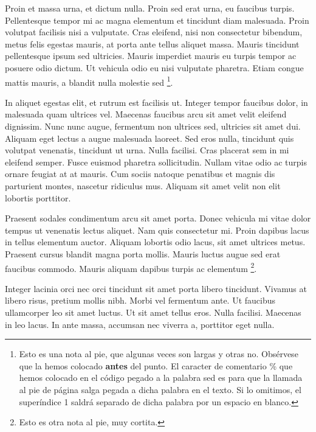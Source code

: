 \documentclass[11pt, a4paper]{report}
\begin{document}
Proin et massa urna, et dictum nulla.
Proin sed erat urna, eu faucibus turpis. Pellentesque tempor mi ac magna elementum et tincidunt diam malesuada. Proin volutpat facilisis nisi a vulputate. Cras eleifend, nisi non consectetur bibendum, metus felis egestas mauris, at porta ante tellus aliquet massa. Mauris tincidunt pellentesque ipsum sed ultricies. Mauris imperdiet mauris eu turpis tempor ac posuere odio dictum. Ut vehicula odio eu nisi vulputate pharetra. Etiam congue mattis mauris, a blandit nulla molestie sed%
\footnote{Esto es una nota al pie, que algunas veces son largas y otras no. Obsérvese que la hemos colocado \textbf{antes} del punto. El caracter de comentario \% que hemos colocado en el código pegado a la palabra sed es para que la llamada al pie de página salga pegada a dicha palabra en el texto. Si lo omitimos, el superíndice 1 saldrá separado de dicha palabra por un espacio en blanco.}.


In aliquet egestas elit, et rutrum est facilisis ut. Integer tempor faucibus dolor, in malesuada quam ultrices vel. Maecenas faucibus arcu sit amet velit eleifend dignissim. Nunc nunc augue, fermentum non ultrices sed, ultricies sit amet dui. Aliquam eget lectus a augue malesuada laoreet. Sed eros nulla, tincidunt quis volutpat venenatis, tincidunt ut urna. Nulla facilisi. Cras placerat sem in mi eleifend semper. Fusce euismod pharetra sollicitudin. Nullam vitae odio ac turpis ornare feugiat at at mauris. Cum sociis natoque penatibus et magnis dis parturient montes, nascetur ridiculus mus. Aliquam sit amet velit non elit lobortis porttitor.

Praesent sodales condimentum arcu sit amet porta.
 Donec vehicula mi vitae dolor tempus ut venenatis lectus aliquet. Nam quis consectetur mi. Proin dapibus lacus in tellus elementum auctor. Aliquam lobortis odio lacus, sit amet ultrices metus. Praesent cursus blandit magna porta mollis. Mauris luctus augue sed erat faucibus commodo. Mauris aliquam dapibus turpis ac elementum%
\footnote{Esto es otra nota al pie, muy cortita.}.

Integer lacinia orci nec orci tincidunt sit amet porta libero tincidunt. Vivamus at libero risus, pretium mollis nibh. Morbi vel fermentum ante. Ut faucibus ullamcorper leo sit amet luctus. Ut sit amet tellus eros. Nulla facilisi. Maecenas in leo lacus. In ante massa, accumsan nec viverra a, porttitor eget nulla.
\end{document}
